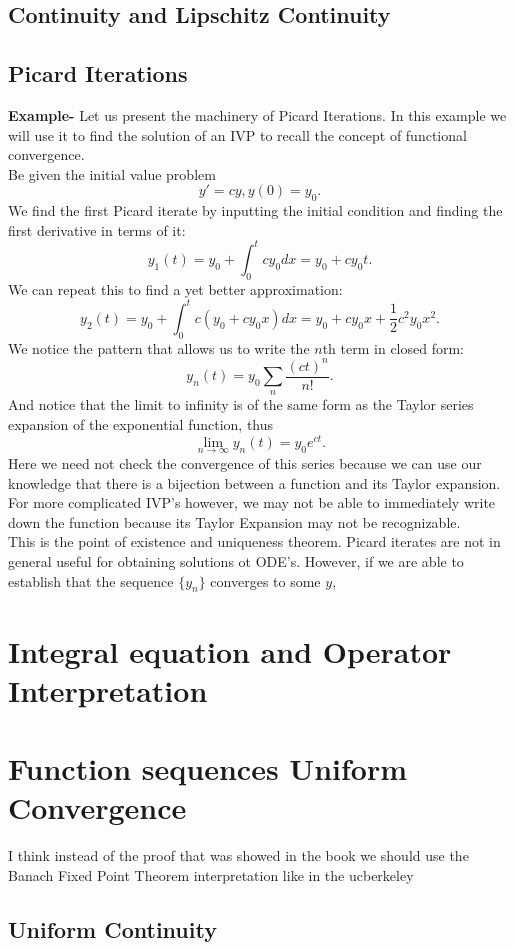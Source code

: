 \documentclass[11 pt]{article}
\begin{document}
\begin{solution}
\subsection{Continuity and Lipschitz Continuity}
\subsection{Picard Iterations}
\textbf{Example- } Let us present the machinery of Picard Iterations. In this example we will use it to find the solution of an IVP to recall the concept of functional convergence.\\
Be given the initial value problem \[
y'=cy, y(0)=y_0
.\] 
We find the first Picard iterate by inputting the initial condition and finding the first derivative in terms of it:
\[
y_1(t)=y_0+\int_{0}^{t}cy_0dx=y_0+cy_0t
.\] 
We can repeat this to find a yet better approximation: \[
y_2(t)=y_0+\int_{0}^{t}c(y_0+cy_0x)dx=y_0+cy_0x+\frac{1}{2}c^2y_0x^2
.\] 
We notice the pattern that allows us to write the $n$th term in closed form: \[
y_n(t)=y_0\sum_{n}\frac{(ct)^n}{n!}
.\] 
And notice that the limit to infinity is of the same form as the Taylor series expansion of the exponential function, thus \[
\lim_{n\to\infty}y_n(t)=y_0e^{ct}
.\]
Here we need not check the convergence of this series because we can use our knowledge that there is a bijection between a function and its Taylor expansion.\\
For more complicated IVP's however, we may not be able to immediately write down the function because its Taylor Expansion may not be recognizable.\\
This is the point of existence and uniqueness theorem. Picard iterates are not in general useful for obtaining solutions ot ODE's. However, if we are able to establish that the sequence $\{y_n\}$ converges to some $y$,
\section{Integral equation and Operator Interpretation}
\section{Function sequences Uniform Convergence}
I think instead of the proof that was showed in the book we should use the Banach Fixed Point Theorem interpretation like in the ucberkeley
\subsection{Uniform Continuity}

\end{solution} 
\end{document}
